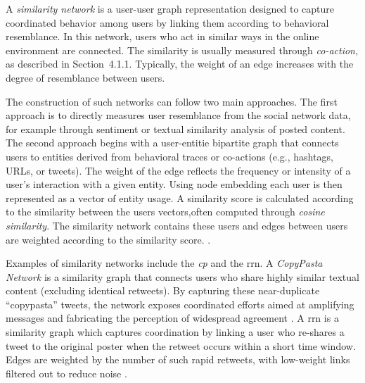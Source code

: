 \documentclass{article}
\begin{document}
A \textit{similarity network} is a user-user graph representation designed to capture coordinated behavior among users by linking them according to behavioral resemblance. In this network, users who act in similar ways in the online environment are connected. The similarity is usually measured through \textit{co-action}, as described in Section~4.1.1. Typically, the weight of an edge increases with the degree of resemblance between users. 

The construction of such networks can follow two main approaches. The first approach is to directly measures user resemblance from the social network data, for example through sentiment or textual similarity analysis of posted content. The second approach begins with a user-entitie bipartite graph that connects users to entities derived from behavioral traces or co-actions (e.g., hashtags, URLs, or tweets). The weight of the edge reflects the frequency or intensity of a user’s interaction with a given entity. Using node embedding each user is then represented as a vector of entity usage. A similarity score is calculated according to the similarity between the users vectors,often computed through \textit{cosine similarity}. The similarity network contains these users and edges between users are weighted according to the similarity score. \cite{luceri2024unmasking, uncovering2021networks}.

Examples of similarity networks include the \textit{\ac{cp}} and the \ac{rrn}. 
A \textit{CopyPasta Network} is a similarity graph that connects users who share highly similar textual content (excluding identical retweets). By capturing these near-duplicate “copypasta” tweets, the network exposes coordinated efforts aimed at amplifying messages and fabricating the perception of widespread agreement \cite{coordinated2024Capitol}. 
A \ac{rrn} is a similarity graph which captures coordination by linking a user who re-shares a tweet to the original poster when the retweet occurs within a short time window. Edges are weighted by the number of such rapid retweets, with low-weight links filtered out to reduce noise \cite{unveiling2020whiteHelmets, coordinated2024Capitol}.
\end{document}
